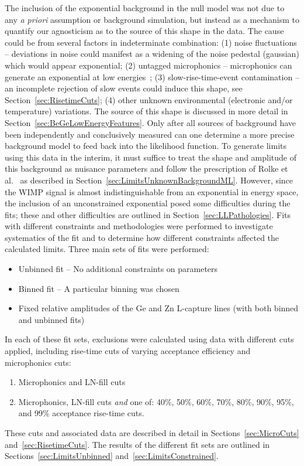 The inclusion of the exponential background in the null model was not due to any \emph{a priori} assumption or background simulation, but instead as a mechanism to quantify our agnosticism as to the source of this shape in the data.  The cause could be from several factors in indeterminate combination: (1) noise fluctuations -- deviations in noise could manifest as a widening of the noise pedestal (gaussian) which would appear exponential; (2) untagged microphonics -- microphonics can generate an exponential at low energies~\cite{Morales1992410}; (3) slow-rise-time-event contamination -- an incomplete rejection of slow events could induce this shape, see Section~\ref{sec:RisetimeCuts}; (4) other unknown environmental (electronic and/or temperature) variations.  The source of this shape is discussed in more detail in Section~\ref{sec:BeGeLowEnergyFeatures}.  Only after all sources of background have been independently and conclusively measured can one determine a more precise background model to feed back into the likelihood function.  To generate limits using this data in the interim, it must suffice to treat the shape and amplitude of this background as nuisance parameters and follow the prescription of Rolke et al.~\cite{Rol05} as described in Section~\ref{sec:LimitsUnknownBackgroundML}.  However, since the WIMP signal is almost indistinguishable from an exponential in energy space, the inclusion of an unconstrained exponential posed some difficulties during the fits; these and other difficulties are outlined in Section~\ref{sec:LLPathologies}.
Fits with different constraints and methodologies were performed to investigate systematics of the fit and to determine how different constraints affected the calculated limits.  Three main sets of fits were performed:
		\begin{itemize}
			\item Unbinned fit -- No additional constraints on parameters
			\item Binned fit -- A particular binning was chosen
			\item Fixed relative amplitudes of the Ge and Zn L-capture lines (with both binned and unbinned fits)
		\end{itemize}			
In each of these fit sets, exclusions were calculated using data with different cuts applied, including rise-time cuts of varying acceptance efficiency and microphonics cuts:
	\begin{enumerate}	
		\item Microphonics and LN-fill cuts
		\item Microphonics, LN-fill cuts \emph{and} one of: 40\%, 50\%, 60\%, 70\%, 80\%, 90\%, 95\%, and 99\%
		acceptance rise-time cuts.
	\end{enumerate}
These cuts and associated data are described in detail in Sections~\ref{sec:MicroCuts} and~\ref{sec:RisetimeCuts}.  The results of the different fit sets are outlined in Sections~\ref{sec:LimitsUnbinned} and~\ref{sec:LimitsConstrained}.  

